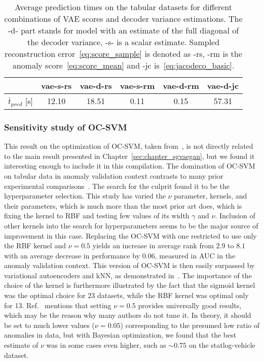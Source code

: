 \begin{table}
    \footnotesize
    \centering
    \tabcolsep=0.05cm
    \begin{tabular}{c|c c c c c}
         & vae-s-rs & vae-d-rs & vae-s-rm & vae-d-rm & vae-d-jc \\
         \midrule
        $\bar{t}_{pred}$ [s] & 12.10 & 18.51 & 0.11 & 0.15 & 57.31
    \end{tabular}
    \vspace*{0.15cm}
    \caption{Average prediction times on the  tabular datasets for different combinations of VAE scores and decoder variance estimations. The -d- part stands for model with an estimate of the full diagonal of the decoder variance, -s- is a scalar estimate. Sampled reconstruction error~\eqref{eq:score_sample} is denoted as -rs, -rm is the anomaly score~\eqref{eq:score_mean} and -jc is~\eqref{eq:jacodeco_basic}.}
    \label{tab:predict_times}
\end{table}


\subsubsection{Sensitivity study of OC-SVM}
\label{sub:OC-SVM}
This result on the optimization of OC-SVM, taken from~\cite{vskvara2021comparison}, is not directly related to the main result presented in Chapter~\ref{sec:chapter_sgvaegan}, but we found it interesting enough to include it in this compilation. The domination of OC-SVM on tabular data in anomaly validation context contrasts to many prior experimental comparisons~\cite{goldstein2016comparative, chalapathyGroupAnomalyDetection2018, deecke2018image, gopalanPIDForestAnomalyDetection2019, iwataSupervisedAnomalyDetection2019, wang2020advae}. The search for the culprit found it to be the hyperparameter selection. This study has varied the $\nu$ parameter, kernels, and their parameters, which is much more than the most prior art does, which is fixing the kernel to RBF and testing few values of its width $\gamma$ and $\nu.$ Inclusion of other kernels into the search for hyperparameters seems to be the major source of improvement in this case. Replacing the OC-SVM with one restricted to use only the RBF kernel and $\nu=0.5$ yields an increase in average rank from $2.9$ to $8.1$ with an average decrease in performance by $0.06$, measured in AUC in the anomaly validation context. This version of OC-SVM is then easily surpassed by variational autoencoders and kNN, as demonstrated in~\cite{vskvara2021comparison}.  The importance of the choice of the kernel is furthermore illustrated by the fact that the sigmoid kernel was the optimal choice for 23 datasets, while the RBF kernel was optimal only for 13. Ref.~\cite{goldstein2016comparative} mentions that setting $\nu=0.5$ provides universally good results, which may be the reason why many authors do not tune it. In theory, it should be set to much lower values ($\nu = 0.05$) corresponding to the presumed low ratio of anomalies in data, but with Bayesian optimization, we found that the best estimate of $\nu$ was in some cases even higher, such as $\sim0.75$ on the statlog-vehicle dataset.

